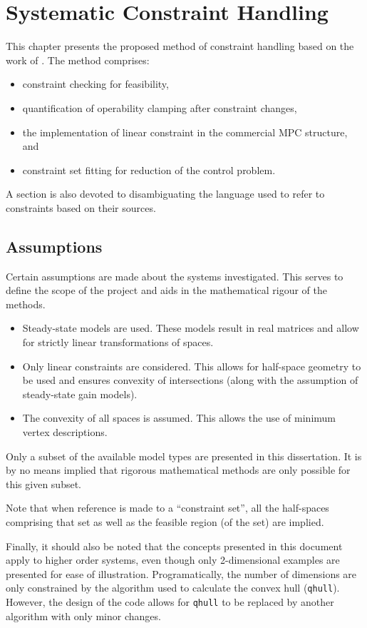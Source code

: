 \chapter{Systematic Constraint Handling}\label{chap:conhand}
\begin{overview}
  This chapter presents the proposed method of constraint handling based on the work of \citet{vinsonphd}.
  The method comprises:
  \begin{itemize}
    \item constraint checking for feasibility,
    \item quantification of operability clamping after constraint changes,
    \item the implementation of linear constraint in the commercial MPC structure, and
    \item constraint set fitting for reduction of the control problem.
  \end{itemize}
  A section is also devoted to disambiguating the language used to refer to constraints based on their sources.
\end{overview}

\section{Assumptions}
Certain assumptions are made about the systems investigated.
This serves to define the scope of the project and aids in the mathematical rigour of the methods.
\begin{itemize}
\item Steady-state models are used.
  These models result in real matrices and allow for strictly linear transformations of spaces.
\item Only linear constraints are considered.
  This allows for half-space geometry to be used and ensures convexity of intersections (along with the assumption of steady-state gain models).
\item The convexity of all spaces is assumed.
  This allows the use of minimum vertex descriptions.
\end{itemize}
Only a subset of the available model types are presented in this dissertation.
It is by no means implied that rigorous mathematical methods are only possible for this given subset.

Note that when reference is made to a ``constraint set'', all the half-spaces comprising that set as well as the feasible region (of the set) are implied.

Finally, it should also be noted that the concepts presented in this document apply to higher order systems, even though only 2-dimensional examples are presented for ease of illustration. 
Programatically, the number of dimensions are only constrained by the algorithm used to calculate the convex hull (\texttt{qhull}).
However, the design of the code allows for \texttt{qhull} to be replaced by another algorithm with only minor changes.

